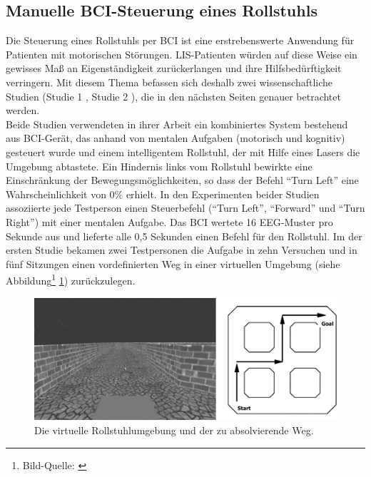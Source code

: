 \pagebreak
\subsection{Manuelle BCI-Steuerung eines Rollstuhls}
\vspace{0.3cm}

Die Steuerung eines Rollstuhls per \acs{BCI} ist eine erstrebenswerte Anwendung für Patienten mit motorischen Störungen.
\ac{LIS}-Patienten würden auf diese Weise ein gewisses Maß an Eigenständigkeit zurückerlangen und ihre Hilfsbedürftigkeit verringern.
Mit diesem Thema befassen sich deshalb zwei wissenschaftliche Studien (Studie 1 \cite{wheelchairBCI2}, Studie 2 \cite{wheelchairBCI3}), die in den nächsten Seiten genauer betrachtet werden.\\



Beide Studien verwendeten in ihrer Arbeit ein kombiniertes System bestehend aus BCI-Gerät, 
das anhand von mentalen Aufgaben (motorisch und kognitiv) gesteuert wurde und einem intelligentem Rollstuhl, der mit Hilfe eines Lasers die Umgebung abtastete.
Ein Hindernis links vom Rollstuhl bewirkte eine Einschränkung der Bewegungsmöglichkeiten, so dass der Befehl "`Turn Left"' eine Wahrscheinlichkeit von 0\% erhielt.
In den Experimenten beider Studien assoziierte jede Testperson einen Steuerbefehl ("`Turn Left"', "`Forward"' und "`Turn Right"') mit einer mentalen Aufgabe.
Das BCI wertete 16 EEG-Muster pro Sekunde aus und lieferte alle 0,5 Sekunden einen Befehl für den Rollstuhl.
Im der ersten Studie bekamen zwei Testpersonen die Aufgabe in zehn Versuchen 
und in fünf Sitzungen einen vordefinierten Weg in einer virtuellen Umgebung (siehe Abbildung\footnote[1]{Bild-Quelle: \cite[S.2161]{wheelchairBCI2}} \ref{TestEnvWheelchair}) zurückzulegen.\\

\begin{figure}[h!]
\begin{center}
\includegraphics[scale=0.45]{images/TestEnvWheelchair.png}
\caption{Die virtuelle Rollstuhlumgebung und der zu absolvierende Weg.}
\label{TestEnvWheelchair}
\end{center}
\end{figure}

